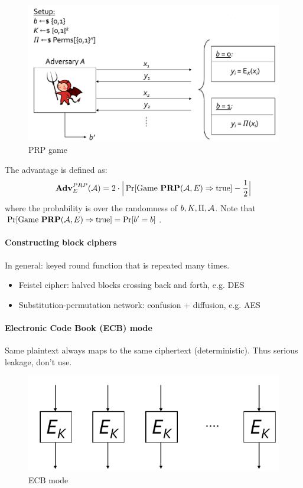 \begin{figure}[h]
    \centering
	\includegraphics[scale=0.4]{images/prp.png}
    \caption{PRP game}
    \label{fig:prp}
\end{figure}

The advantage is defined as:
$$
\mathbf{Adv}^{PRP}_E (\mathcal{A})
= 2 \cdot \Big| \Pr[ \text{Game }\textbf{PRP}(\mathcal{A}, E) \Rightarrow \text{true} ] - \frac{1}{2} \Big|
$$
where the probability is over the randomness of $b, K, \Pi, \mathcal{A}$.
Note that $\Pr[ \text{Game }\textbf{PRP}(\mathcal{A}, E) \Rightarrow \text{true} ] = \Pr[b'=b]$.

\paragraph{Constructing block ciphers}
In general: keyed round function that is repeated many times.

\begin{itemize}
\item Feistel cipher: halved blocks crossing back and forth, e.g. DES
\item Substitution-permutation network: confusion + diffusion, e.g. AES
\end{itemize}

\paragraph{Electronic Code Book (ECB) mode}
Same plaintext always maps to the same ciphertext (deterministic).
Thus serious leakage, don't use.

\begin{figure}[h]
    \centering
	\includegraphics[scale=0.4]{images/ecb.png}
    \caption{ECB mode}
    \label{fig:ecb}
\end{figure}

